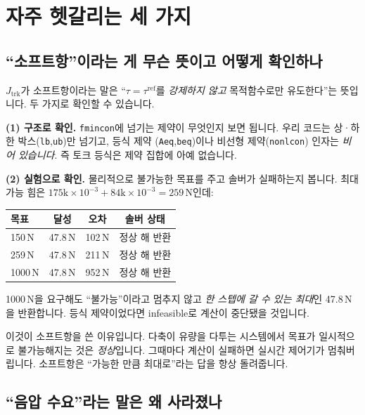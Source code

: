 \documentclass[11pt]{article}
\begin{document}
\section{자주 헷갈리는 세 가지}

\subsection{``소프트항''이라는 게 무슨 뜻이고 어떻게 확인하나}

$J_{\mathrm{trk}}$가 소프트항이라는 말은 ``$\tau=\tau^{\mathrm{ref}}$를 \emph{강제하지
않고} 목적함수로만 유도한다''는 뜻입니다. 두 가지로 확인할 수 있습니다.

\textbf{(1) 구조로 확인.} \texttt{fmincon}에 넘기는 제약이 무엇인지 보면 됩니다.
우리 코드는 상·하한 박스(\texttt{lb},\texttt{ub})만 넘기고, 등식 제약
(\texttt{Aeq},\texttt{beq})이나 비선형 제약(\texttt{nonlcon}) 인자는 \emph{비어
있습니다}. 즉 토크 등식은 제약 집합에 아예 없습니다.

\textbf{(2) 실험으로 확인.} 물리적으로 불가능한 목표를 주고 솔버가 실패하는지 봅니다.
최대 가능 힘은 $175\text{k}\times10^{-3}+84\text{k}\times10^{-3}=259$\,N인데:
\begin{center}\small
\begin{tabular}{lccc}
\toprule
목표 & 달성 & 오차 & 솔버 상태\\
\midrule
150\,N & 47.8\,N & 102\,N & 정상 해 반환\\
259\,N & 47.8\,N & 211\,N & 정상 해 반환\\
1000\,N & 47.8\,N & 952\,N & 정상 해 반환\\
\bottomrule
\end{tabular}
\end{center}
1000\,N을 요구해도 ``불가능''이라고 멈추지 않고 \emph{한 스텝에 갈 수 있는 최대}인
47.8\,N을 반환합니다. 등식 제약이었다면 infeasible로 계산이 중단됐을 것입니다.

\begin{keybox}
이것이 소프트항을 쓴 이유입니다. 다축이 유량을 다투는 시스템에서 목표가 일시적으로
불가능해지는 것은 \emph{정상}입니다. 그때마다 계산이 실패하면 실시간 제어기가
멈춰버립니다. 소프트항은 ``가능한 만큼 최대로''라는 답을 항상 돌려줍니다.
\end{keybox}

\subsection{``음압 수요''라는 말은 왜 사라졌나}
\end{document}
